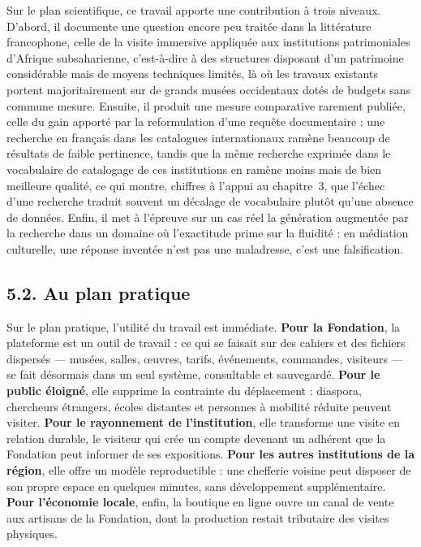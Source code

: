 Sur le plan scientifique, ce travail apporte une contribution à trois niveaux.
D'abord, il documente une question encore peu traitée dans la littérature
francophone, celle de la visite immersive appliquée aux institutions
patrimoniales d'Afrique subsaharienne, c'est-à-dire à des structures disposant
d'un patrimoine considérable mais de moyens techniques limités, là où les
travaux existants portent majoritairement sur de grands musées occidentaux dotés
de budgets sans commune mesure. Ensuite, il produit une mesure comparative
rarement publiée, celle du gain apporté par la reformulation d'une requête
documentaire : une recherche en français dans les catalogues internationaux
ramène beaucoup de résultats de faible pertinence, tandis que la même recherche
exprimée dans le vocabulaire de catalogage de ces institutions en ramène moins
mais de bien meilleure qualité, ce qui montre, chiffres à l'appui au
chapitre~3, que l'échec d'une recherche traduit souvent un décalage de
vocabulaire plutôt qu'une absence de données. Enfin, il met à l'épreuve sur un
cas réel la génération augmentée par la recherche dans un domaine où l'exactitude
prime sur la fluidité : en médiation culturelle, une réponse inventée n'est pas
une maladresse, c'est une falsification.

\subsection*{5.2. Au plan pratique}

Sur le plan pratique, l'utilité du travail est immédiate. \textbf{Pour la
Fondation}, la plateforme est un outil de travail : ce qui se faisait sur des
cahiers et des fichiers dispersés — musées, salles, œuvres, tarifs, événements,
commandes, visiteurs — se fait désormais dans un seul système, consultable et
sauvegardé. \textbf{Pour le public éloigné}, elle supprime la contrainte du
déplacement : diaspora, chercheurs étrangers, écoles distantes et personnes à
mobilité réduite peuvent visiter. \textbf{Pour le rayonnement de
l'institution}, elle transforme une visite en relation durable, le visiteur qui
crée un compte devenant un adhérent que la Fondation peut informer de ses
expositions. \textbf{Pour les autres institutions de la région}, elle offre un
modèle reproductible : une chefferie voisine peut disposer de son propre espace
en quelques minutes, sans développement supplémentaire. \textbf{Pour l'économie
locale}, enfin, la boutique en ligne ouvre un canal de vente aux
artisans de la Fondation, dont la production restait tributaire des visites
physiques.

